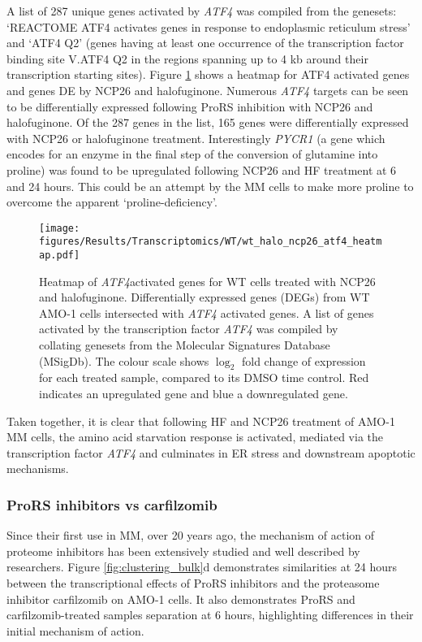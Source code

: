 A list of 287 unique genes activated by \textit{ATF4} was compiled from the genesets: `REACTOME ATF4 activates genes in response to endoplasmic reticulum stress' and `ATF4 Q2' (genes having at least one occurrence of the transcription factor binding site V.ATF4 Q2 in the regions spanning up to 4 kb around their transcription starting sites).
Figure \ref{fig:wt_atf4_heatmap} shows a heatmap for ATF4 activated genes and genes DE by NCP26 and halofuginone.
Numerous \textit{ATF4} targets can be seen to be differentially expressed following ProRS inhibition with NCP26 and halofuginone.
Of the 287 genes in the list, 165 genes were differentially expressed with NCP26 or halofuginone treatment.
Interestingly \textit{PYCR1} (a gene which encodes for an enzyme in the final step of the conversion of glutamine into proline) was found to be upregulated following NCP26 and HF treatment at 6 and 24 hours.
This could be an attempt by the MM cells to make more proline to overcome the apparent `proline-deficiency'.


\begin{figure}[p]
\centering
\texttt{[image: figures/Results/Transcriptomics/WT/wt\_halo\_ncp26\_atf4\_heatmap.pdf]}
\caption[Heatmap of \textit{ATF4} activated genes for ProRS treated WT cells]{Heatmap of \textit{ATF4}activated genes for WT cells treated with NCP26 and halofuginone.
Differentially expressed genes (DEGs) from WT AMO-1 cells intersected with \textit{ATF4} activated genes.
A list of genes activated by the transcription factor \textit{ATF4} was compiled by collating genesets from the Molecular Signatures Database (MSigDb).
The colour scale shows $\log_{2}$ fold change of expression for each treated sample, compared to its DMSO time control.
Red indicates an upregulated gene and blue a downregulated gene.
}
\label{fig:wt_atf4_heatmap}
\end{figure}

Taken together, it is clear that following HF and NCP26 treatment of AMO-1 MM cells, the amino acid starvation response is activated, mediated via the transcription factor \textit{ATF4} and culminates in ER stress and downstream apoptotic mechanisms.

\subsubsection{ProRS inhibitors vs carfilzomib}
Since their first use in MM, over 20 years ago, the mechanism of action of proteome inhibitors has been extensively studied and well described by researchers\cite{nunes2017proteasome}.
Figure \ref{fig:clustering_bulk}d demonstrates similarities at 24 hours between the transcriptional effects of ProRS inhibitors and the proteasome inhibitor carfilzomib on AMO-1 cells.
It also demonstrates ProRS and carfilzomib-treated samples separation at 6 hours, highlighting differences in their initial mechanism of action.

